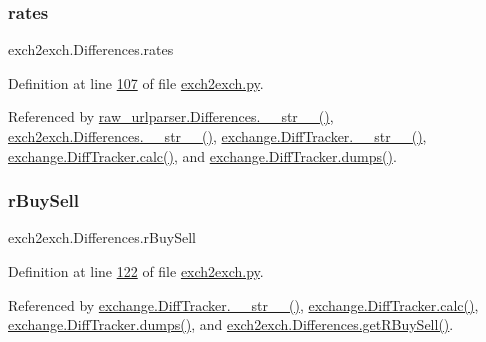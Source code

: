 \mbox{\label{classexch2exch_1_1_differences_a64aec2fc7f20028f0bd834908cbea116}} 
\subsubsection{\texorpdfstring{rates}{rates}}
{\footnotesize\ttfamily exch2exch.\+Differences.\+rates}



Definition at line \hyperlink{exch2exch_8py_source_l00107}{107} of file \hyperlink{exch2exch_8py_source}{exch2exch.\+py}.



Referenced by \hyperlink{raw__urlparser_8py_source_l00100}{raw\+\_\+urlparser.\+Differences.\+\_\+\+\_\+str\+\_\+\+\_\+()}, \hyperlink{exch2exch_8py_source_l00154}{exch2exch.\+Differences.\+\_\+\+\_\+str\+\_\+\+\_\+()}, \hyperlink{exchange_8py_source_l00336}{exchange.\+Diff\+Tracker.\+\_\+\+\_\+str\+\_\+\+\_\+()}, \hyperlink{exchange_8py_source_l00309}{exchange.\+Diff\+Tracker.\+calc()}, and \hyperlink{exchange_8py_source_l00385}{exchange.\+Diff\+Tracker.\+dumps()}.

\mbox{\label{classexch2exch_1_1_differences_a3cbdf344e8e0b804c611e6b9e3a3d1bd}} 
\subsubsection{\texorpdfstring{r\+Buy\+Sell}{rBuySell}}
{\footnotesize\ttfamily exch2exch.\+Differences.\+r\+Buy\+Sell}



Definition at line \hyperlink{exch2exch_8py_source_l00122}{122} of file \hyperlink{exch2exch_8py_source}{exch2exch.\+py}.



Referenced by \hyperlink{exchange_8py_source_l00336}{exchange.\+Diff\+Tracker.\+\_\+\+\_\+str\+\_\+\+\_\+()}, \hyperlink{exchange_8py_source_l00309}{exchange.\+Diff\+Tracker.\+calc()}, \hyperlink{exchange_8py_source_l00385}{exchange.\+Diff\+Tracker.\+dumps()}, and \hyperlink{exch2exch_8py_source_l00142}{exch2exch.\+Differences.\+get\+R\+Buy\+Sell()}.

